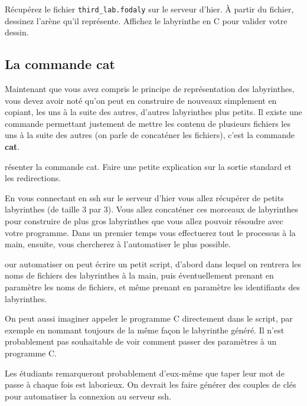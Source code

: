 \documentclass[a4paper]{article}
\newenvironment{enseignants}[1]{\noindent\color{blue}{\bf #1}}{}
\begin{document}
Récupérez le fichier \verb|third_lab.fodaly| sur le serveur d'hier.
À partir du fichier, dessinez l'arène qu'il représente.
Affichez le labyrinthe en C pour valider votre dessin.


\subsection{La commande cat}

Maintenant que vous avez compris le principe de représentation des labyrinthes, vous devez avoir noté qu'on peut en construire de nouveaux simplement en copiant, les uns à la suite des autres, d'autres labyrinthes plus petits. Il existe une commande permettant justement de mettre les contenu de plusieurs fichiers les uns à la suite des autres (on parle de concaténer les fichiers), c'est la commande \textbf{cat}.

\begin{enseignants}
  Présenter la commande cat.
  Faire une petite explication sur la sortie standard et les redirections.
\end{enseignants}

En vous connectant en ssh sur le serveur d'hier vous allez récupérer de petits labyrinthes (de taille 3 par 3). Vous allez concaténer ces morceaux de labyrinthes pour construire de plus gros labyrinthes que vous allez pouvoir résoudre avec votre programme.
Dans un premier temps vous effectuerez tout le processus à la main,
ensuite, vous chercherez à l'automatiser le plus possible.

\begin{enseignants}
  Pour automatiser on peut écrire un petit script, d'abord dans lequel on rentrera les noms de fichiers des labyrinthes à la main, puis éventuellement prenant en paramètre les noms de fichiers, et même prenant en paramètre les identifiants des labyrinthes.

  On peut aussi imaginer appeler le programme C directement dans le script, par exemple en nommant toujours de la même façon le labyrinthe généré. Il n'est probablement pas souhaitable de voir comment passer des paramètres à un programme C.

  Les étudiants remarqueront probablement d'eux-même que taper leur mot de passe à chaque fois est laborieux. On devrait les faire générer des couples de clés pour automatiser la connexion au serveur ssh.
\end{enseignants}
\end{document}
